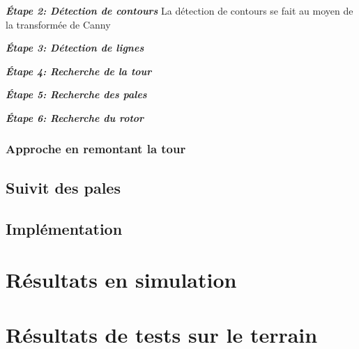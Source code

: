 \textbf{\textit{Étape 2: Détection de contours}} La détection de contours se fait au moyen de la transformée de Canny 

\textbf{\textit{Étape 3: Détection de lignes}}

\textbf{\textit{Étape 4: Recherche de la tour}}

\textbf{\textit{Étape 5: Recherche des pales}}

\textbf{\textit{Étape 6: Recherche du rotor}}

\subsubsection{Approche en remontant la tour}


\subsection{Suivit des pales}


\subsection{Implémentation}


\section{Résultats en simulation}


\section{Résultats de tests sur le terrain}


\subsection{}
